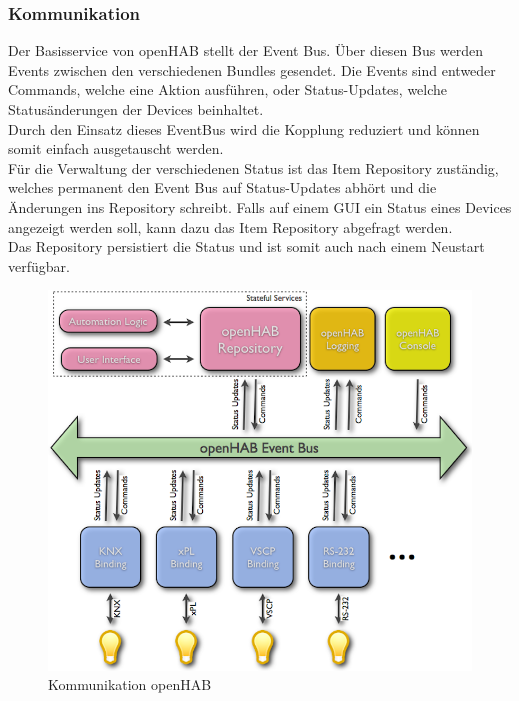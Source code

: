 \subsubsection{Kommunikation}
Der Basisservice von openHAB stellt der Event Bus. Über diesen Bus werden Events zwischen den verschiedenen Bundles gesendet. Die Events sind entweder Commands, welche eine Aktion ausführen, oder Status-Updates, welche Statusänderungen der Devices beinhaltet. \\
Durch den Einsatz dieses EventBus wird die Kopplung reduziert und können somit einfach ausgetauscht werden. \\
Für die Verwaltung der verschiedenen Status ist das Item Repository zuständig, welches permanent den Event Bus auf Status-Updates abhört und die Änderungen ins Repository schreibt. Falls auf einem GUI ein Status eines Devices angezeigt werden soll, kann dazu das Item Repository abgefragt werden.\\
Das Repository persistiert die Status und ist somit auch nach einem Neustart verfügbar.

\begin{figure}[H]
	\centering
		\includegraphics[scale=0.4]{report/img/communicationOH}
	\caption{Kommunikation openHAB}
	\label{fig:ohComm}
\end{figure}

